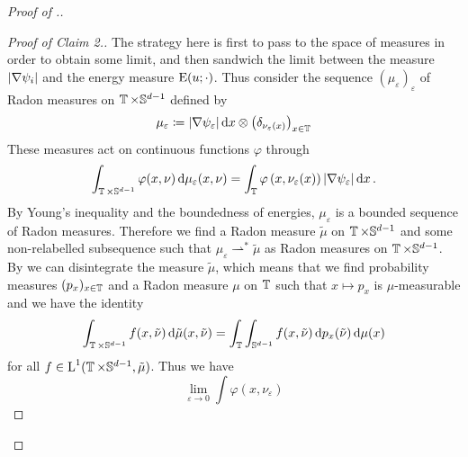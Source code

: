 \begin{proof}[Proof of .]
	\begin{proof}[Proof of Claim 2.]
		The strategy here is first to pass to the space of measures in order to 
		obtain some limit, and then sandwich the limit between the measure $ 
		\abs{ \nabla \psi_{ i } } $ and the energy measure $ \operatorname{E} ( u ; 
		\cdot ) $.
		Thus consider the sequence $ ( \mu_{ \varepsilon } )_{ \varepsilon } $ 
		of 
		Radon measures on $ \operatorname{\mathbb{T}} \times \mathbb{ S }^{ d - 1 } $ defined 
		by 
		\begin{equation*}
			\mu_{ \varepsilon }
			\coloneqq
			\abs{ \nabla \psi_{ \varepsilon } } \dd{ x }
			\otimes
			\left( \delta_{ \nu_{ \varepsilon } ( x ) } \right)_{ x \in 
			\operatorname{\mathbb{T}} }
		\end{equation*}
		These measures act on continuous functions $ \varphi $ through
		\begin{equation*}
			\int_{ \operatorname{\mathbb{T}} \times \mathbb{ S }^{ d - 1 } }
			\varphi ( x , \nu )
			\dd{ \mu_{ \varepsilon } ( x , \nu ) }
			=
			\int_{ \operatorname{\mathbb{T}} }
			\varphi \left( x , \nu_{ \varepsilon } ( x ) \right) 
			\abs{ \nabla \psi_{ \varepsilon } }
			\dd{ x }.
		\end{equation*}
		By Young's inequality and the boundedness of energies, 
		$ \mu_{ \varepsilon } $ is a bounded sequence of Radon measures.
		Therefore we find a 
		Radon measure 
		$ \tilde{ \mu } $ on $ \operatorname{\mathbb{T}} \times \mathbb{ S }^{ d - 1 } $ 
		and some non-relabelled subsequence such that 
		$ \mu_{ \varepsilon } \rightharpoonup^{ \ast } \tilde{ \mu } $ 
		as Radon measures on 
		$ \operatorname{\mathbb{T}} \times \mathbb{ S }^{ d - 1 } $.
		By 
		\cite[Thm.~2.28]{ambrosio_fusco_pallara_functions_of_bv_and_free_discontinuity_problems}
		we can disintegrate the measure $ \tilde{ \mu } $, which means that we 
		find probability measures $ ( p_{ x } )_{ x \in \operatorname{\mathbb{T}} } $ and a 
		Radon measure $ \mu $ on $ \operatorname{\mathbb{T}} $ such that $ x \mapsto p_{ x } $ 
		is $ \mu $-measurable and we have the identity 
		\begin{equation*}
			\int_{ \operatorname{\mathbb{T}} \times \mathbb{ S }^{ d - 1 } }
			f ( x , \tilde{ \nu } )
			\dd{ \tilde{ \mu } ( x, \tilde{ \nu } ) }
			=
			\int_{ \operatorname{\mathbb{T}} }
			\int_{ \mathbb{ S }^{ d - 1 } }
			f ( x , \tilde{ \nu } )
			\dd{ p_{ x } ( \tilde{ \nu } ) }
			\dd{ \mu ( x ) }
		\end{equation*}
		for all $ f \in \operatorname{L}^{ 1 } ( \operatorname{\mathbb{T}} \times \mathbb{ S }^{ d -1 } , 
		\tilde{ \mu } ) $.
		Thus we have
		\begin{equation*}
			\lim_{ \varepsilon \to 0 }
			\int
			\varphi ( x , \nu_{ \varepsilon } ) 

\end{equation*}
\end{proof}
\end{proof}
